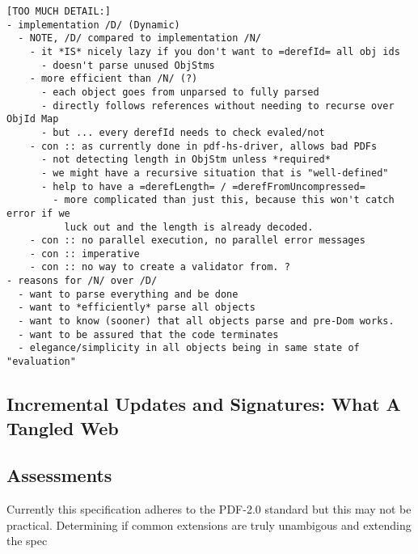 \begin{lstlisting}[style=meta]
[TOO MUCH DETAIL:]
- implementation /D/ (Dynamic)
  - NOTE, /D/ compared to implementation /N/     
    - it *IS* nicely lazy if you don't want to =derefId= all obj ids
      - doesn't parse unused ObjStms
    - more efficient than /N/ (?)
      - each object goes from unparsed to fully parsed
      - directly follows references without needing to recurse over ObjId Map
      - but ... every derefId needs to check evaled/not
    - con :: as currently done in pdf-hs-driver, allows bad PDFs
      - not detecting length in ObjStm unless *required*
      - we might have a recursive situation that is "well-defined"
      - help to have a =derefLength= / =derefFromUncompressed=
        - more complicated than just this, because this won't catch error if we
          luck out and the length is already decoded.
    - con :: no parallel execution, no parallel error messages
    - con :: imperative
    - con :: no way to create a validator from. ?
- reasons for /N/ over /D/
  - want to parse everything and be done
  - want to *efficiently* parse all objects
  - want to know (sooner) that all objects parse and pre-Dom works.
  - want to be assured that the code terminates 
  - elegance/simplicity in all objects being in same state of "evaluation"
\end{lstlisting}

\subsection{Incremental Updates and Signatures: What A Tangled Web }
\label{sec:updates-and-signatures}



\subsection{Assessments}

Currently this specification adheres to the PDF-2.0 standard but this
may not be practical.
%
Determining if common extensions are truly unambigous and extending
the spec 

